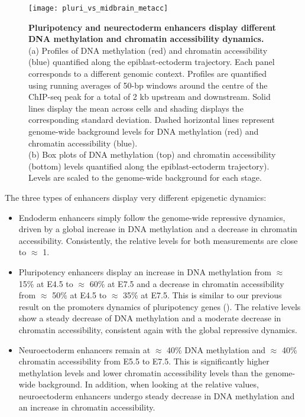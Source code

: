 \begin{figure}[H]
	\centering
	\texttt{[image: pluri\_vs\_midbrain\_metacc]}
	\caption[]{
	\textbf{Pluripotency and neurectoderm enhancers display different DNA methylation and chromatin accessibility dynamics.} \\
	(a) Profiles of DNA methylation (red) and chromatin accessibility (blue) quantified along the epiblast-ectoderm trajectory. Each panel corresponds to a different genomic context. Profiles are quantified using running averages of 50-bp windows around the centre of the ChIP-seq peak for a total of 2 kb upstream and downstream. Solid lines display the mean across cells and shading displays the corresponding standard deviation. Dashed horizontal lines represent genome-wide background levels for DNA methylation (red) and chromatin accessibility (blue). \\
	(b)	Box plots of DNA methylation (top) and chromatin accessibility (bottom) levels quantified along the epiblast-ectoderm trajectory). Levels are scaled to the genome-wide background for each stage.
	}
	\label{fig:pluri_vs_midbrain_metacc}
\end{figure}

The three types of enhancers display very different epigenetic dynamics:
\begin{itemize}
	\item Endoderm enhancers simply follow the genome-wide repressive dynamics, driven by a global increase in DNA methylation and a decrease in chromatin accessibility. Consistently, the relative levels for both measurements are close to $\approx$ 1.

	\item Pluripotency enhancers display an increase in DNA methylation from $\approx$ 15\% at E4.5 to $\approx$ 60\% at E7.5 and a decrease in chromatin accessibility from $\approx$ 50\% at E4.5 to $\approx$ 35\% at E7.5. This is similar to our previous result on the promoters dynamics of pluripotency genes (). The relative levels show a steady decrease of DNA methylation and a moderate decrease in chromatin accessibility, consistent again with the global repressive dynamics.

	\item Neuroectoderm enhancers remain at $\approx$ 40\% DNA methylation and $\approx$ 40\% chromatin accessibility from E5.5 to E7.5. This is significantly higher methylation levels and lower chromatin accessibility levels than the genome-wide background. In addition, when looking at the relative values, neuroectoderm enhancers undergo steady decrease in DNA methylation and an increase in chromatin accessibility.

\end{itemize}

